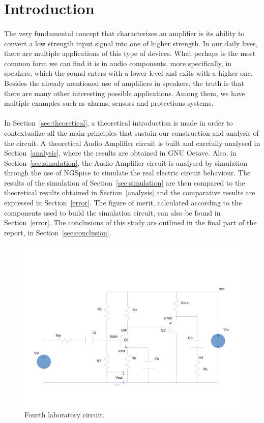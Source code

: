\pagebreak

\section{Introduction}
\label{sec:introduction}

\paragraph{}The very fundamental concept that characterizes an amplifier is its ability to convert a low strength input signal into one of higher strength. In our daily lives, there are multiple applications of this type of devices. What perhaps is the most common form we can find it is in audio components, more specifically, in speakers, which the sound enters with a lower level and exits with a higher one. Besides the already mentioned use of amplifiers in speakers, the truth is that there are many other interesting possible applications. Among them, we have multiple examples such as alarms, sensors and protections systems.

\paragraph{}
In Section~\ref{sec:theoretical}, a theoretical introduction is made in order to contextualize all the main principles that sustain our construction and analysis of the circuit. A theoretical Audio Amplifier circuit is built and carefully analysed in Section~\ref{analysis}, where the results are obtained in GNU Octave. Also, in Section~\ref{sec:simulation}, the Audio Amplifier circuit is analysed by simulation through the use of NGSpice to simulate the real electric circuit behaviour. The results of the simulation of Section~\ref{sec:simulation} are then compared to the theoretical results obtained in Section~\ref{analysis} and the comparative results are expressed in Section~\ref{error}. The figure of merit, calculated according to the components used to build the simulation circuit, can also be found in Section~\ref{error}. The conclusions of this study are outlined in the final part of the report, in Section~\ref{sec:conclusion}.

\begin{figure}[H] \centering
	\includegraphics[width=0.7\linewidth]{circuit.pdf}
	\caption{Fourth laboratory circuit.}
	\label{fig:circuit}
\end{figure}
